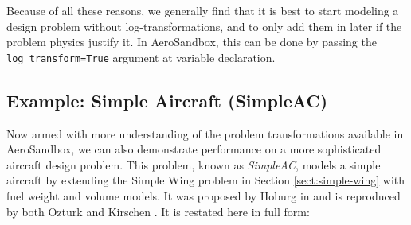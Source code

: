 Because of all these reasons, we generally find that it is best to start modeling a design problem without log-transformations, and to only add them in later if the problem physics justify it. In AeroSandbox, this can be done by passing the \texttt{log_transform=True} argument at variable declaration.

\subsection{Example: Simple Aircraft (SimpleAC)}
\label{sect:simpleac}

Now armed with more understanding of the problem transformations available in AeroSandbox, we can also demonstrate performance on a more sophisticated aircraft design problem. This problem, known as \textit{SimpleAC}, models a simple aircraft by extending the Simple Wing problem in Section \ref{sect:simple-wing} with fuel weight and volume models. It was proposed by Hoburg in \cite{hoburg} and is reproduced by both Ozturk \cite{Ozturk2018} and Kirschen \cite{kirschen}. It is restated here in full form:

